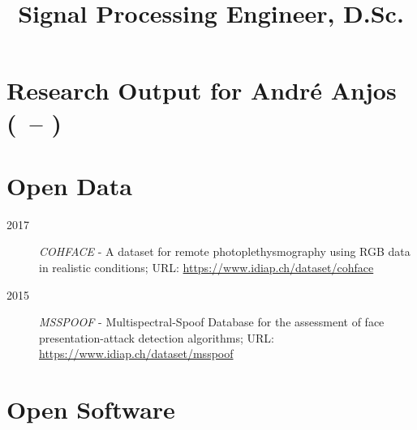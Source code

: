 \documentclass[11pt,a4paper,sans]{moderncv}
\title{Signal Processing Engineer, D.Sc.}
\newcounter{startyear}
\begin{document}
\setcounter{startyear}{\year-4}
\section{Research Output for André Anjos (\thestartyear\ -- \the\year)}


\renewcommand{\refname}{Research Output List (reverse chronological order)}
\nocite{*}

\printbibliography[title={Peer Reviewed Journal Articles}, type=article]

\printbibliography[title={Peer Reviewed Books}, type=incollection]

\printbibliography[title={Peer Reviewed Conference Proceedings}, type=inproceedings]

\printbibliography[title={Patents}, type=patent]

\printbibliography[title={Open Access Archive}, type=misc]

\section{Open Data}

\begin{description}
  \item[2017] \textit{COHFACE} - A dataset for remote photoplethysmography
    using RGB data in realistic conditions;
    URL: \url{https://www.idiap.ch/dataset/cohface}

  \item[2015] \textit{MSSPOOF} - Multispectral-Spoof Database for the
    assessment of face presentation-attack detection algorithms;
    URL: \url{https://www.idiap.ch/dataset/msspoof}
\end{description}

\section{Open Software}
\end{document}
